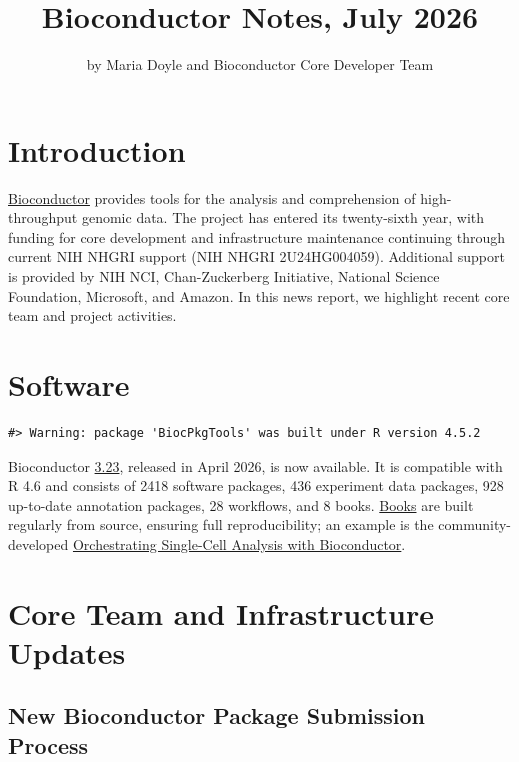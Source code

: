 \title{Bioconductor Notes, July 2026}


\author{by Maria Doyle and Bioconductor Core Developer Team}

\maketitle


\section{Introduction}\label{introduction}

\href{https://bioconductor.org}{Bioconductor} provides
tools for the analysis and comprehension of high-throughput genomic
data. The project has entered its twenty-sixth year, with funding
for core development and infrastructure maintenance continuing through current NIH NHGRI support (NIH NHGRI 2U24HG004059). Additional support is provided
by NIH NCI, Chan-Zuckerberg Initiative, National Science Foundation,
Microsoft, and Amazon. In this news report, we highlight recent core team and project activities.

\section{Software}\label{software}

\begin{verbatim}
#> Warning: package 'BiocPkgTools' was built under R version 4.5.2
\end{verbatim}

Bioconductor \href{https://bioconductor.org/news/bioc_3_23_release/}{3.23}, released in April 2026, is now available. It is
compatible with R 4.6 and consists of 2418 software packages, 436
experiment data packages, 928 up-to-date annotation packages, 28
workflows, and 8 books. \href{https://bioconductor.org/books/release/}{Books} are
built regularly from source, ensuring full reproducibility; an example is the
community-developed \href{https://bioconductor.org/books/release/OSCA/}{Orchestrating Single-Cell Analysis with Bioconductor}.

\section{Core Team and Infrastructure Updates}\label{core-team-and-infrastructure-updates}

\subsection{New Bioconductor Package Submission Process}\label{new-bioconductor-package-submission-process}

